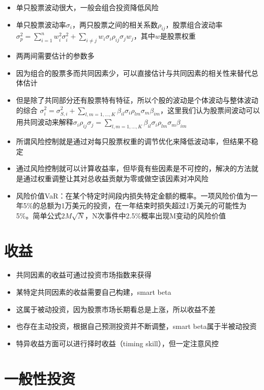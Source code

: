 \documentclass[
]{book}
\providecommand{\tightlist}{%
  \setlength{\itemsep}{0pt}\setlength{\parskip}{0pt}}
\begin{document}
\begin{itemize}
\tightlist
\item
  单只股票波动很大，一般会组合投资降低风险
\item
  单只股票波动率\(\sigma_i\)，两只股票之间的相关系数\(\rho_{ij}\)，股票组合波动率\(\sigma_p^2 = \sum_{i=1}^nw_i^2\sigma_i^2 + \sum_{i\neq j}w_i\sigma_i\rho_{ij}\sigma_jw_j\)，其中\(w\)是股票权重
\item
  两两间需要估计的参数多
\item
  因为组合的股票多而共同因素少，可以直接估计与共同因素的相关性来替代总体估计
\item
  但是除了共同部分还有股票特有特征，所以个股的波动是个体波动与整体波动的综合 \(\sigma_i^2 = \sigma_{S,i}^2 + \sum_{l,m = 1,...,K}\beta_{il}\sigma_i\rho_{lm}\sigma_m\beta_{im}\)，这里我们认为股票间波动可以用共同波动来解释\(\sigma_i\rho_{ij}\sigma_j = \sum_{l,m = 1,...,K}\beta_{il}\sigma_i\rho_{lm}\sigma_m\beta_{im}\)
\item
  所谓风险控制就是通过对每只股票权重的调节优化来降低波动率，但结果不稳定
\item
  通过风险控制就可以计算收益率，但毕竟有些因素是不可控的，解决的方法就是通过权重调整让其对总收益贡献为零或做空该因素对冲风险
\item
  风险价值VaR：在某个特定时间段内损失特定金额的概率。一项风险价值为一年5\%的总额为1万美元的投资，在一年结束时损失超过1万美元的可能性为5\%。简单公式\(2M\sqrt{N}\)，N次事件中2.5\%概率出现M变动的风险价值
\end{itemize}

\hypertarget{ux6536ux76ca}{%
\section{收益}\label{ux6536ux76ca}}

\begin{itemize}
\tightlist
\item
  共同因素的收益可通过投资市场指数来获得
\item
  某特定共同因素的收益需要自己构建，smart beta
\item
  这属于被动投资，因为股票市场长期看总是上涨，所以收益不差
\item
  也存在主动投资，根据自己预测投资并不断调整，smart beta属于半被动投资
\item
  特异收益方面可以进行择时收益（timing skill），但一定注意风控
\end{itemize}

\hypertarget{ux4e00ux822cux6027ux6295ux8d44}{%
\section{一般性投资}\label{ux4e00ux822cux6027ux6295ux8d44}}
\end{document}
